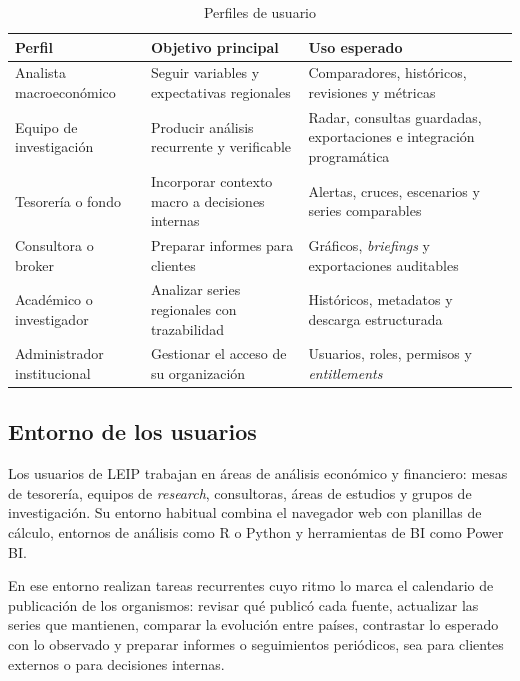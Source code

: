 \documentclass[11pt,a4paper]{article}
\newcommand{\proyectoNombre}{LEIP}
\begin{document}
\begin{table}[htbp]
\centering
\caption{Perfiles de usuario}
\label{tab:perfiles}
\begin{tabularx}{\textwidth}{l X X}
\toprule
\textbf{Perfil} & \textbf{Objetivo principal} & \textbf{Uso esperado} \\
\midrule
Analista macroecon\'omico & Seguir variables y expectativas regionales & Comparadores, hist\'oricos, revisiones y m\'etricas \\
\addlinespace
Equipo de investigaci\'on & Producir an\'alisis recurrente y verificable & Radar, consultas guardadas, exportaciones e integraci\'on program\'atica \\
\addlinespace
Tesorer\'ia o fondo & Incorporar contexto macro a decisiones internas & Alertas, cruces, escenarios y series comparables \\
\addlinespace
Consultora o broker & Preparar informes para clientes & Gr\'aficos, \emph{briefings} y exportaciones auditables \\
\addlinespace
Acad\'emico o investigador & Analizar series regionales con trazabilidad & Hist\'oricos, metadatos y descarga estructurada \\
\addlinespace
Administrador institucional & Gestionar el acceso de su organizaci\'on & Usuarios, roles, permisos y \emph{entitlements} \\
\bottomrule
\end{tabularx}
\end{table}

\subsection{Entorno de los usuarios}

Los usuarios de \proyectoNombre{} trabajan en \'areas de an\'alisis econ\'omico
y financiero: mesas de tesorer\'ia, equipos de \emph{research}, consultoras,
\'areas de estudios y grupos de investigaci\'on. Su entorno habitual combina el
navegador web con planillas de c\'alculo, entornos de an\'alisis como R o Python
y herramientas de BI como Power BI.

En ese entorno realizan tareas recurrentes cuyo ritmo lo marca el calendario de
publicaci\'on de los organismos: revisar qu\'e public\'o cada fuente, actualizar
las series que mantienen, comparar la evoluci\'on entre pa\'ises, contrastar lo
esperado con lo observado y preparar informes o seguimientos peri\'odicos, sea
para clientes externos o para decisiones internas.
\end{document}
